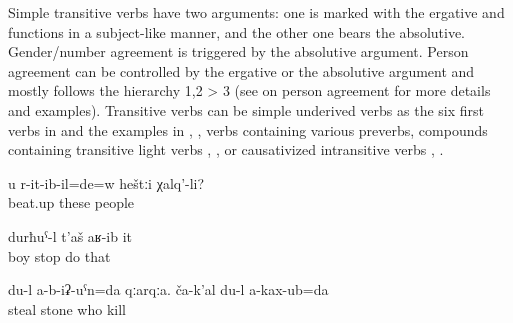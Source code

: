 Simple transitive verbs have two arguments: one is marked with the ergative and functions in a subject-like manner, and the other one bears the absolutive. Gender/number agreement is triggered by the absolutive argument. Person agreement can be controlled by the ergative or the absolutive argument and mostly follows the hierarchy 1,2 > 3 (see  on person agreement for more details and examples). Transitive verbs can be simple underived verbs as the six first verbs in  and the examples in , , verbs containing various preverbs, compounds containing transitive light verbs , , or causativized intransitive verbs , . 
%
\begin{exe}
	\ex	\label{ex:transitive verbs}
	\begin{xlist}
		\ex	{} 
		\ex	{} 
		\ex	{} 
		\ex	{}	
		\ex	{} 
		\ex	{} 
		\ex	{} 
		\ex	{} 
		\ex	{} 	
		\ex	{} 
		\ex	{} 
	\end{xlist}

	\ex	\label{ex:Did these people beat you up}
	\gll	u	r-it-ib-il=de=w	heštːi	χalq'-li?\\
			beat.up	these	people\\
	\glt	{}

	\ex	\label{ex:The boy stopped him}
	\gll	durħuˁ-l	t'aš	aʁ-ib	it\\
		boy	stop	do	that\\
	\glt	{}

	\ex	\label{ex:‎‎I did not steal the stone. I did not kill anyone}
	\gll	du-l	a-b-iʡ-uˁn=da	qːarqːa.	ča-k'al	du-l	a-kax-ub=da\\
		 steal stone	who		kill\\
	\glt	{}
\end{exe}


